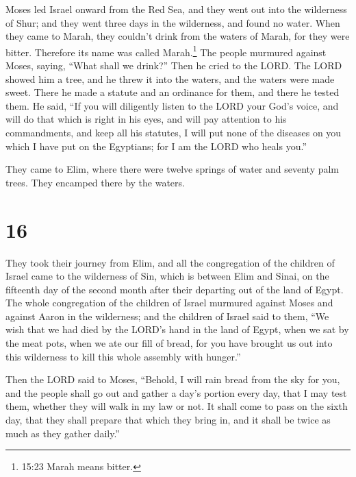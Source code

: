  Moses led Israel onward from the Red Sea, and they went
out into the wilderness of Shur; and they went three days in the
wilderness, and found no water.  When they came to Marah,
they couldn't drink from the waters of Marah, for they were bitter.
Therefore its name was called Marah.\footnote{15:23 Marah means bitter.}
 The people murmured against Moses, saying, ``What shall we
drink?''  Then he cried to the LORD. The LORD showed him a
tree, and he threw it into the waters, and the waters were made sweet.
There he made a statute and an ordinance for them, and there he tested
them.  He said, ``If you will diligently listen to the LORD
your God's voice, and will do that which is right in his eyes, and will
pay attention to his commandments, and keep all his statutes, I will put
none of the diseases on you which I have put on the Egyptians; for I am
the LORD who heals you.''

 They came to Elim, where there were twelve springs of
water and seventy palm trees. They encamped there by the waters.

\hypertarget{section-15}{%
\section{16}\label{section-15}}

 They took their journey from Elim, and all the congregation
of the children of Israel came to the wilderness of Sin, which is
between Elim and Sinai, on the fifteenth day of the second month after
their departing out of the land of Egypt.  The whole
congregation of the children of Israel murmured against Moses and
against Aaron in the wilderness;  and the children of Israel
said to them, ``We wish that we had died by the LORD's hand in the land
of Egypt, when we sat by the meat pots, when we ate our fill of bread,
for you have brought us out into this wilderness to kill this whole
assembly with hunger.''

 Then the LORD said to Moses, ``Behold, I will rain bread
from the sky for you, and the people shall go out and gather a day's
portion every day, that I may test them, whether they will walk in my
law or not.  It shall come to pass on the sixth day, that
they shall prepare that which they bring in, and it shall be twice as
much as they gather daily.''


